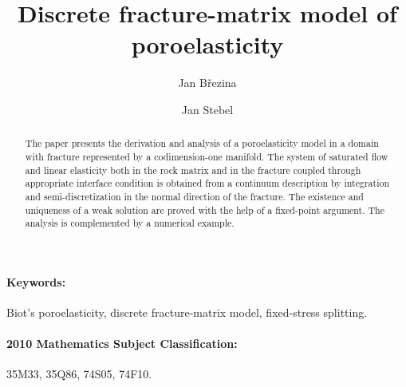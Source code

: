 \documentclass[a4paper]{article}
\numberwithin{equation}{section}
\begin{document}
\title{Discrete fracture-matrix model of poroelasticity}
\author{Jan Březina}
\author{Jan Stebel}
\maketitle

\begin{abstract}
The paper presents the derivation and analysis of a poroelasticity model in a domain with fracture represented by a codimension-one manifold. The system of saturated flow and linear elasticity both in the rock matrix and in the fracture coupled through appropriate interface condition is obtained from a continuum description by integration and semi-discretization in the normal direction of the fracture.
The existence and uniqueness of a weak solution are proved with the help of a fixed-point argument.
The analysis is complemented by a numerical example.
\end{abstract}

\paragraph{Keywords:}
Biot's poroelasticity, discrete fracture-matrix model, fixed-stress splitting.

\paragraph{2010 Mathematics Subject Classification:}
35M33, %
35Q86, %
74S05, %
74F10. %
\end{document}
